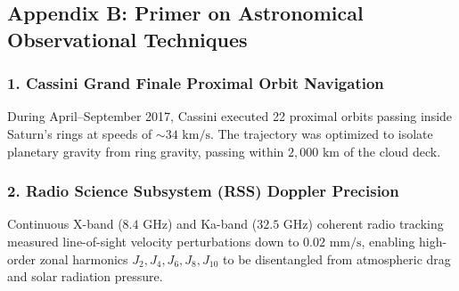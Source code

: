 \documentclass[11pt,a4paper]{article}
\begin{document}
\subsection*{Appendix B: Primer on Astronomical Observational Techniques}

\subsubsection*{1. Cassini Grand Finale Proximal Orbit Navigation}
During April--September 2017, Cassini executed 22 proximal orbits passing inside Saturn's rings at speeds of $\sim 34\text{ km/s}$. The trajectory was optimized to isolate planetary gravity from ring gravity, passing within $2,000\text{ km}$ of the cloud deck.

\subsubsection*{2. Radio Science Subsystem (RSS) Doppler Precision}
Continuous X-band ($8.4\text{ GHz}$) and Ka-band ($32.5\text{ GHz}$) coherent radio tracking measured line-of-sight velocity perturbations down to $0.02\text{ mm/s}$, enabling high-order zonal harmonics $J_2, J_4, J_6, J_8, J_{10}$ to be disentangled from atmospheric drag and solar radiation pressure.
\end{document}
